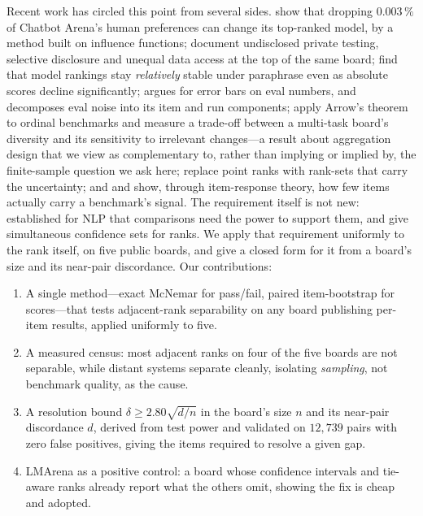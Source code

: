 \documentclass[11pt]{article}
\begin{document}
Recent work has circled this point from several sides. \citet{huang2025} show that dropping
$0.003\,\%$ of Chatbot Arena's human preferences can change its top-ranked model, by a method built
on influence functions; \citet{singh2025} document undisclosed private testing, selective
disclosure and unequal data access at the top of the same board; \citet{lunardi2025} find that
model rankings stay \emph{relatively} stable under paraphrase even as absolute scores decline
significantly; \citet{miller2024} argues for error bars on eval
numbers, and \citet{wang2025} decomposes eval noise into its item and run components; \citet{zhang2024}
apply Arrow's theorem to ordinal benchmarks and measure a trade-off between a multi-task board's
diversity and its sensitivity to irrelevant changes---a
result about aggregation design that we view as complementary to, rather than implying or implied by,
the finite-sample question we ask here;
\citet{chatzi2024} replace point ranks with rank-sets that carry the uncertainty; and \citet{polo2024} and
\citet{kipnis2024} show, through item-response theory, how few
items actually carry a benchmark's signal. The requirement itself is not new:
\citet{card2020} established for NLP that comparisons need the power to support them, and
\citet{mogstad2024} give simultaneous confidence sets for ranks. We apply that requirement
uniformly to the rank itself, on five public boards, and give a closed form for it from a board's
size and its near-pair discordance. Our contributions:
\begin{enumerate}\itemsep2pt
  \item A single method---exact McNemar for pass/fail, paired item-bootstrap for scores---that tests
  adjacent-rank separability on any board publishing per-item results, applied uniformly to five.
  \item A measured census: most adjacent ranks on four of the five boards are not separable, while
  distant systems separate cleanly, isolating \emph{sampling}, not benchmark quality, as the cause.
  \item A resolution bound $\delta \ge 2.80\sqrt{d/n}$ in the board's size $n$ and its near-pair
  discordance $d$, derived from test power and validated on
  $12{,}739$ pairs with zero false positives, giving the items required to resolve a given gap.
  \item LMArena as a positive control: a board whose confidence intervals and tie-aware ranks already
  report what the others omit, showing the fix is cheap and adopted.
\end{enumerate}
\end{document}
